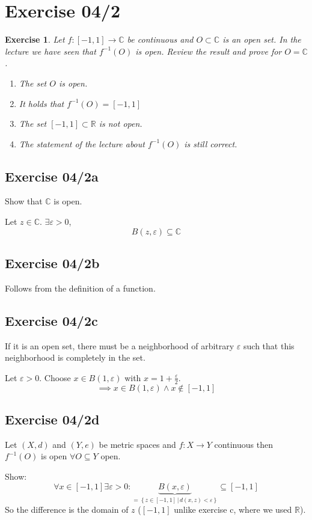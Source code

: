 \documentclass{article}
\newtheorem{ex}{Exercise} %
\newcommand{\setdef}[2]{\left\{\left.#1\,\right|\,#2\right\}}
\begin{document}
\section{Exercise 04/2}
\begin{ex}
  Let $f: [-1,1] \to \mathbb C$ be continuous and $O \subset \mathbb C$ is an open set.
  In the lecture we have seen that $f^{-1}(O)$ is open.
  Review the result and prove for $O = \mathbb C$.
  \begin{enumerate}
    \item The set $O$ is open.
    \item It holds that $f^{-1}(O) = [-1,1]$
    \item The set $[-1,1] \subset \mathbb R$ is not open.
    \item The statement of the lecture about $f^{-1}(O)$ is still correct.
  \end{enumerate}
\end{ex}

\subsection{Exercise 04/2a}
Show that $\mathbb C$ is open.

Let $z \in \mathbb C$. $\exists \varepsilon > 0$,
\[ B(z, \varepsilon) \subseteq \mathbb C \]

\subsection{Exercise 04/2b}
Follows from the definition of a function.

\subsection{Exercise 04/2c}
If it is an open set, there must be a neighborhood of arbitrary $\varepsilon$
such that this neighborhood is completely in the set.

Let $\varepsilon > 0$. Choose $x \in B(1, \varepsilon)$ with $x = 1 + \frac{\varepsilon}2$.
\[ \implies x \in B(1, \varepsilon) \land x \not\in [-1,1] \]

\subsection{Exercise 04/2d}
Let $(X,d)$ and $(Y,e)$ be metric spaces and $f: X \to Y$ continuous
then $f^{-1}(O)$ is open $\forall O \subseteq Y$ open.

Show:
\[ \forall x \in [-1,1] \exists \varepsilon > 0: \underbrace{B(x, \varepsilon)}_{= \setdef{z \in [-1,1]}{d(x, z) < \varepsilon}} \subseteq [-1,1] \]
So the difference is the domain of $z$ ($[-1,1]$ unlike exercise c, where we used $\mathbb R$).
\end{document}
